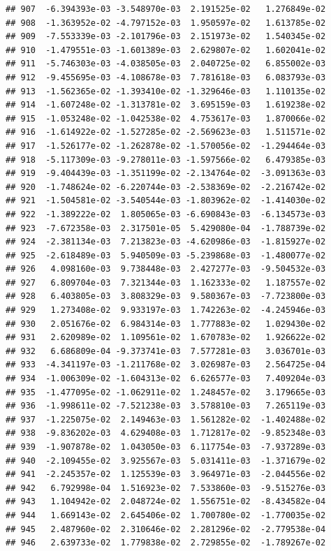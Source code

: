 \documentclass[
]{article}
\begin{document}
\begin{verbatim}
## 907  -6.394393e-03 -3.548970e-03  2.191525e-02   1.276849e-02
## 908  -1.363952e-02 -4.797152e-03  1.950597e-02   1.613785e-02
## 909  -7.553339e-03 -2.101796e-03  2.151973e-02   1.540345e-02
## 910  -1.479551e-03 -1.601389e-03  2.629807e-02   1.602041e-02
## 911  -5.746303e-03 -4.038505e-03  2.040725e-02   6.855002e-03
## 912  -9.455695e-03 -4.108678e-03  7.781618e-03   6.083793e-03
## 913  -1.562365e-02 -1.393410e-02 -1.329646e-03   1.110135e-02
## 914  -1.607248e-02 -1.313781e-02  3.695159e-03   1.619238e-02
## 915  -1.053248e-02 -1.042538e-02  4.753617e-03   1.870066e-02
## 916  -1.614922e-02 -1.527285e-02 -2.569623e-03   1.511571e-02
## 917  -1.526177e-02 -1.262878e-02 -1.570056e-02  -1.294464e-03
## 918  -5.117309e-03 -9.278011e-03 -1.597566e-02   6.479385e-03
## 919  -9.404439e-03 -1.351199e-02 -2.134764e-02  -3.091363e-03
## 920  -1.748624e-02 -6.220744e-03 -2.538369e-02  -2.216742e-02
## 921  -1.504581e-02 -3.540544e-03 -1.803962e-02  -1.414030e-02
## 922  -1.389222e-02  1.805065e-03 -6.690843e-03  -6.134573e-03
## 923  -7.672358e-03  2.317501e-05  5.429080e-04  -1.788739e-02
## 924  -2.381134e-03  7.213823e-03 -4.620986e-03  -1.815927e-02
## 925  -2.618489e-03  5.940509e-03 -5.239868e-03  -1.480077e-02
## 926   4.098160e-03  9.738448e-03  2.427277e-03  -9.504532e-03
## 927   6.809704e-03  7.321344e-03  1.162333e-02   1.187557e-02
## 928   6.403805e-03  3.808329e-03  9.580367e-03  -7.723800e-03
## 929   1.273408e-02  9.933197e-03  1.742263e-02  -4.245946e-03
## 930   2.051676e-02  6.984314e-03  1.777883e-02   1.029430e-02
## 931   2.620989e-02  1.109561e-02  1.670783e-02   1.926622e-02
## 932   6.686809e-04 -9.373741e-03  7.577281e-03   3.036701e-03
## 933  -4.341197e-03 -1.211768e-02  3.026987e-03   2.564725e-04
## 934  -1.006309e-02 -1.604313e-02  6.626577e-03   7.409204e-03
## 935  -1.477095e-02 -1.062911e-02  1.248457e-02   3.179665e-03
## 936  -1.998611e-02 -7.521238e-03  3.578810e-03   7.265119e-03
## 937  -1.225075e-02  2.149463e-03  1.561282e-02  -1.402488e-02
## 938  -9.836202e-03  4.629408e-03  1.712817e-02  -9.852348e-03
## 939  -1.907878e-02  1.043050e-03  6.117754e-03  -7.937289e-03
## 940  -2.109455e-02  3.925567e-03  5.031411e-03  -1.371679e-02
## 941  -2.245357e-02  1.125539e-03  3.964971e-03  -2.044556e-02
## 942   6.792998e-04  1.516923e-02  7.533860e-03  -9.515276e-03
## 943   1.104942e-02  2.048724e-02  1.556751e-02  -8.434582e-04
## 944   1.669143e-02  2.645406e-02  1.700780e-02  -1.770035e-02
## 945   2.487960e-02  2.310646e-02  2.281296e-02  -2.779538e-04
## 946   2.639733e-02  1.779838e-02  2.729855e-02  -1.789267e-02

\end{verbatim}
\end{document}
